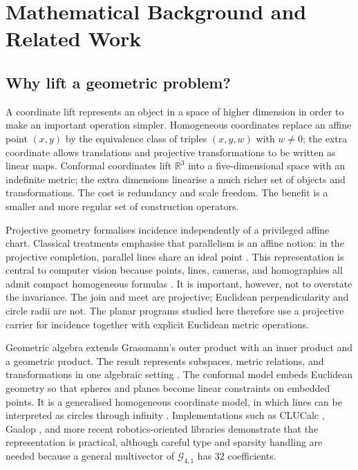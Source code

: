 \documentclass[11pt,a4paper]{article}
\theoremstyle{plain}
\theoremstyle{definition}
\theoremstyle{remark}
\newcommand{\R}{\mathbb{R}}
\newcommand{\GA}{\mathcal{G}_{4,1}}
\begin{document}
\section{Mathematical Background and Related Work}\label{sec:background}

\subsection{Why lift a geometric problem?}

A coordinate lift represents an object in a space of higher dimension in order
to make an important operation simpler. Homogeneous coordinates replace an
affine point $(x,y)$ by the equivalence class of triples $(x,y,w)$ with
$w\neq0$; the extra coordinate allows translations and projective
transformations to be written as linear maps. Conformal coordinates lift $\R^3$
into a five-dimensional space with an indefinite metric; the extra dimensions
linearise a much richer set of objects and transformations. The cost is
redundancy and scale freedom. The benefit is a smaller and more regular set of
construction operators.

Projective geometry formalises incidence independently of a privileged affine
chart. Classical treatments emphasise that parallelism is an affine notion: in
the projective completion, parallel lines share an ideal point
\citep{coxeter1987}. This representation is central to computer vision because
points, lines, cameras, and homographies all admit compact homogeneous formulas
\citep{hartley2004}. It is important, however, not to overstate the
invariance. The join and meet are projective; Euclidean perpendicularity and
circle radii are not. The planar programs studied here therefore use a
projective carrier for incidence together with explicit Euclidean metric
operations.

Geometric algebra extends Grassmann's outer product \citep{grassmann1844} with
an inner product and a geometric product. The result represents subspaces,
metric relations, and transformations in one algebraic setting
\citep{hestenes1984,dorst2007}. The conformal model embeds Euclidean geometry
so that spheres and planes become linear constraints on embedded points. It is
a generalised homogeneous coordinate model, in which lines can be interpreted
as circles through infinity \citep{li2001}. Implementations such as CLUCalc
\citep{perwass2009}, Gaalop \citep{hildenbrand2013}, and more recent
robotics-oriented libraries \citep{low2023} demonstrate that the representation
is practical, although careful type and sparsity handling are needed because a
general multivector of $\GA$ has $32$ coefficients.
\end{document}
